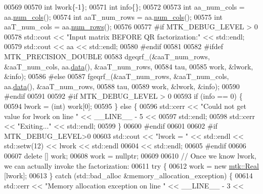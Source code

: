 \begin{DoxyCode}
00569 
00570   \textcolor{keywordtype}{int} lwork\{-1\};
00571   \textcolor{keywordtype}{int} info\{\};
00572 
00573   \textcolor{keywordtype}{int} aa\_num\_cols = aa.\hyperlink{classmtk_1_1DenseMatrix_a41747502d468c6728a4be31501b16e0e}{num\_cols}();
00574   \textcolor{keywordtype}{int} aaT\_num\_rows = aa.\hyperlink{classmtk_1_1DenseMatrix_a41747502d468c6728a4be31501b16e0e}{num\_cols}();
00575   \textcolor{keywordtype}{int} aaT\_num\_cols = aa.\hyperlink{classmtk_1_1DenseMatrix_a53f3afb3b6a8d21854458aaa9663cc74}{num\_rows}();
00576 
00577 \textcolor{preprocessor}{  #if MTK\_DEBUG\_LEVEL > 0}
00578   std::cout << \textcolor{stringliteral}{"Input matrix BEFORE QR factorization:"} << std::endl;
00579   std::cout << aa << std::endl;
00580 \textcolor{preprocessor}{  #endif}
00581 
00582 \textcolor{preprocessor}{  #ifdef MTK\_PRECISION\_DOUBLE}
00583   dgeqrf\_(&aaT\_num\_rows, &aaT\_num\_cols, aa.\hyperlink{classmtk_1_1DenseMatrix_a0c33b8a9e01d157c61ddbdf807c25d84}{data}(), &aaT\_num\_rows,
00584           tau,
00585           work, &lwork, &info);
00586 \textcolor{preprocessor}{  #else}
00587   fgeqrf\_(&aaT\_num\_rows, &aaT\_num\_cols, aa.\hyperlink{classmtk_1_1DenseMatrix_a0c33b8a9e01d157c61ddbdf807c25d84}{data}(), &aaT\_num\_rows,
00588           tau,
00589           work, &lwork, &info);
00590 \textcolor{preprocessor}{  #endif}
00591 
00592 \textcolor{preprocessor}{  #if MTK\_DEBUG\_LEVEL > 0}
00593   \textcolor{keywordflow}{if} (info == 0) \{
00594     lwork = (int) work[0];
00595   \} \textcolor{keywordflow}{else} \{
00596     std::cerr << \textcolor{stringliteral}{"Could not get value for lwork on line "} << \_\_LINE\_\_ - 5 <<
00597       std::endl;
00598     std::cerr << \textcolor{stringliteral}{"Exiting..."} << std::endl;
00599   \}
00600 \textcolor{preprocessor}{  #endif}
00601 
00602 \textcolor{preprocessor}{  #if MTK\_DEBUG\_LEVEL>0}
00603   std::cout << \textcolor{stringliteral}{"lwork = "} << std::endl << std::setw(12) << lwork << std::endl
00604     << std::endl;
00605 \textcolor{preprocessor}{  #endif}
00606 
00607   \textcolor{keyword}{delete} [] work;
00608   work = \textcolor{keyword}{nullptr};
00609 
00610   \textcolor{comment}{// Once we know lwork, we can actually invoke the factorization:}
00611   \textcolor{keywordflow}{try} \{
00612     work = \textcolor{keyword}{new} \hyperlink{group__c01-roots_gac080bbbf5cbb5502c9f00405f894857d}{mtk::Real} [lwork];
00613   \} \textcolor{keywordflow}{catch} (std::bad\_alloc &memory\_allocation\_exception) \{
00614     std::cerr << \textcolor{stringliteral}{"Memory allocation exception on line "} << \_\_LINE\_\_ - 3 <<

\end{DoxyCode}
